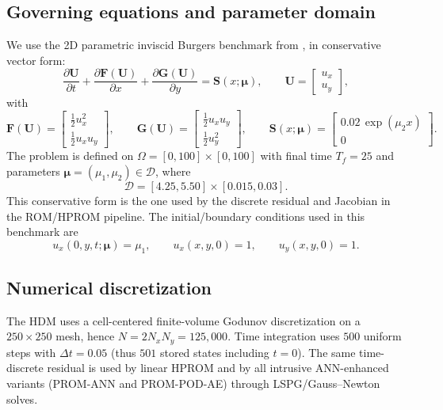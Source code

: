 \documentclass[11pt]{article}
\begin{document}
\subsection{Governing equations and parameter domain}
We use the 2D parametric inviscid Burgers benchmark from \cite{barnett2023neural},
in conservative vector form:
\begin{equation}
\frac{\partial \mathbf U}{\partial t}
+\frac{\partial \mathbf F(\mathbf U)}{\partial x}
+\frac{\partial \mathbf G(\mathbf U)}{\partial y}
=\mathbf S(x;\bm\mu),
\qquad
\mathbf U=
\begin{bmatrix}
u_x\\ u_y
\end{bmatrix},
\end{equation}
with
\begin{equation}
\mathbf F(\mathbf U)=
\begin{bmatrix}
\tfrac{1}{2}u_x^2\\
\tfrac{1}{2}u_xu_y
\end{bmatrix},
\qquad
\mathbf G(\mathbf U)=
\begin{bmatrix}
\tfrac{1}{2}u_xu_y\\
\tfrac{1}{2}u_y^2
\end{bmatrix},
\qquad
\mathbf S(x;\bm\mu)=
\begin{bmatrix}
0.02\,\exp(\mu_2 x)\\
0
\end{bmatrix}.
\end{equation}
The problem is defined on $\Omega=[0,100]\times[0,100]$ with final time
$T_f=25$ and parameters $\bm\mu=(\mu_1,\mu_2)\in\mathcal D$, where
\begin{equation}
\mathcal D=[4.25,5.50]\times[0.015,0.03].
\end{equation}
This conservative form is the one used by the discrete residual and Jacobian in
the ROM/HPROM pipeline.
The initial/boundary conditions used in this benchmark are
\begin{equation}
u_x(0,y,t;\bm\mu)=\mu_1,\qquad
u_x(x,y,0)=1,\qquad
u_y(x,y,0)=1.
\end{equation}

\subsection{Numerical discretization}
The HDM uses a cell-centered finite-volume Godunov discretization on a
$250\times250$ mesh, hence $N=2N_xN_y=125{,}000$. Time integration uses
$500$ uniform steps with $\Delta t=0.05$ (thus $501$ stored states including
$t=0$). The same time-discrete residual is used by linear HPROM and by all
intrusive ANN-enhanced variants (PROM-ANN and PROM-POD-AE) through
LSPG/Gauss--Newton solves.
\end{document}
